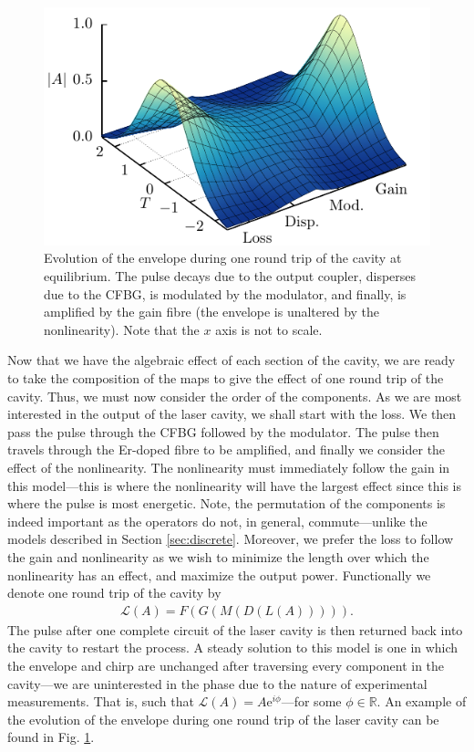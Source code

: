 \documentclass[9pt,twocolumn,twoside]{osajnl}
\begin{document}
\begin{figure}[tbp]
	\centering
	\includegraphics{Figures/Evo}
	\caption{Evolution of the envelope during one round trip of the cavity at equilibrium. The pulse decays due to the output coupler, disperses due to the CFBG, is modulated by the modulator, and finally, is amplified by the gain fibre (the envelope is unaltered by the nonlinearity). Note that the $x$ axis is not to scale.}
	\label{fig:cavityevo}
\end{figure}

Now that we have the algebraic effect of each section of the cavity, we are ready to take the composition of the maps to give the effect of one round trip of the cavity. Thus, we must now consider the order of the components. As we are most interested in the output of the laser cavity, we shall start with the loss. We then pass the pulse through the CFBG followed by the modulator. The pulse then travels through the Er-doped fibre to be amplified, and finally we consider the effect of the nonlinearity. The nonlinearity must immediately follow the gain in this model---this is where the nonlinearity will have the largest effect since this is where the pulse is most energetic. Note, the permutation of the components is indeed important as the operators do not, in general, commute---unlike the models described in Section \ref{sec:discrete}. Moreover, we prefer the loss to follow the gain and nonlinearity as we wish to minimize the length over which the nonlinearity has an effect, and maximize the output power. Functionally we denote one round trip of the cavity by
\begin{align}
	\mathcal{L}(A) = F(G(M(D(L(A))))).
	\label{eq:order}
\end{align}
 The pulse after one complete circuit of the laser cavity is then returned back into the cavity to restart the process. A steady solution to this model is one in which the envelope and chirp are unchanged after traversing every component in the cavity---we are uninterested in the phase due to the nature of experimental measurements. That is, such that $\mathcal{L}(A) = A \textrm{e}^{i \phi}$---for some $\phi \in \mathbb{R}$. An example of the evolution of the envelope during one round trip of the laser cavity can be found in Fig. \ref{fig:cavityevo}.
\end{document}
